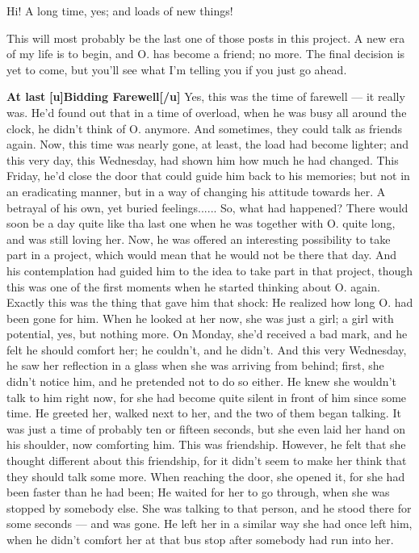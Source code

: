 Hi! A long time, yes; and loads of new things!

This will most probably be the last one of those posts in this project. A new era of my life is to begin, and O. has become a friend; no more. The final decision is yet to come, but you'll see what I'm telling you if you just go ahead. 

\textbf{At last}
\textbf{[u]Bidding Farewell[/u]}
Yes, this was the time of farewell --- it really was. He'd found out that in a time of overload, when he was busy all around the clock, he didn't think of O. anymore. 
And sometimes, they could talk as friends again. 
Now, this time was nearly gone, at least, the load had become lighter; and this very day, this Wednesday, had shown him how much he had changed. 
This Friday, he'd close the door that could guide him back to his memories; but not in an eradicating manner, but in a way of changing his attitude towards her. A betrayal of his own, yet buried feelings......
So, what had happened?
There would soon be a day quite like tha last one when he was together with O. quite long, and was still loving her. Now, he was offered an interesting possibility to take part in a project, which would mean that he would not be there that day. And his contemplation had guided him to the idea to take part in that project, though this was one of the first moments when he started thinking about O. again. Exactly this was the thing that gave him that shock: He realized how long O. had been gone for him. When he looked at her now, she was just a girl; a girl with potential, yes, but nothing more. 
On Monday, she'd received a bad mark, and he felt he should comfort her; he couldn't, and he didn't. 
And this very Wednesday, he saw her reflection in a glass when she was arriving from behind; first, she didn't notice him, and he pretended not to do so either. 
He knew she wouldn't talk to him right now, for she had become quite silent in front of him since some time. 
He greeted her, walked next to her, and the two of them began talking. 
It was just a time of probably ten or fifteen seconds, but she even laid her hand on his shoulder, now comforting him. This was friendship. 
However, he felt that she thought different about this friendship, for it didn't seem to make her think that they should talk some more. When reaching the door, she opened it, for she had been faster than he had been; He waited for her to go through, when she was stopped by somebody else. She was talking to that person, and he stood there for some seconds --- and was gone. 
He left her in a similar way she had once left him, when he didn't comfort her at that bus stop after somebody had run into her. 

